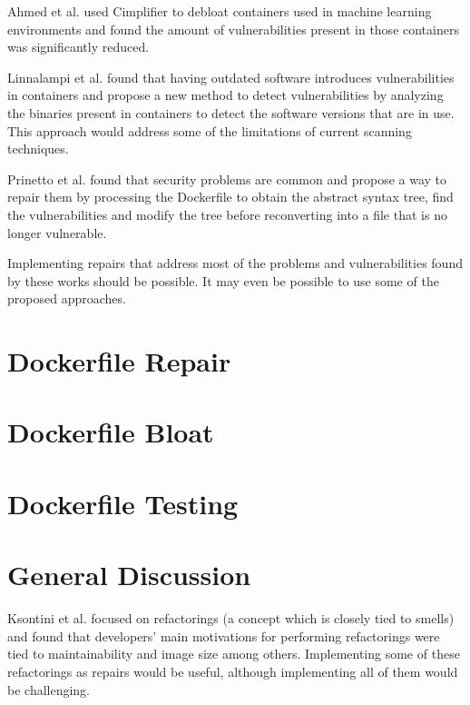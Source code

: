 Ahmed et al. \cite{ahmedSecurityAnalysisCode2022} used Cimplifier \cite{rastogiCimplifierAutomaticallyDebloating2017} to debloat containers used in machine learning environments and found the amount of vulnerabilities present in those containers was significantly reduced.

Linnalampi et al. \cite{linnalampiOutdatedSoftwareContainer2021} found that having outdated software introduces vulnerabilities in containers and propose a new method to detect vulnerabilities by analyzing the binaries present in containers to detect the software versions that are in use. This approach would address some of the limitations of current scanning techniques.

Prinetto et al. \cite{prinettoSecurityMisconfigurationsDetection} found that security problems are common and propose a way to repair them by processing the Dockerfile to obtain the abstract syntax tree, find the vulnerabilities and modify the tree before reconverting into a file that is no longer vulnerable.

Implementing repairs that address most of the problems and vulnerabilities found by these works should be possible. It may even be possible to use some of the proposed approaches.

\section{Dockerfile Repair} \label{sec:dockerfile_repair}
\section{Dockerfile Bloat} \label{sec:dockerfile_bloat}
\section{Dockerfile Testing} \label{sec:dockerfile_testing}
\section{General Discussion} \label{sec:general_discussion}

Ksontini et al. \cite{ksontiniRefactoringsTechnicalDebt} focused on refactorings (a concept which is closely tied to smells) and found that developers' main motivations for performing refactorings were tied to maintainability and image size among others. Implementing some of these refactorings as repairs would be useful, although implementing all of them would be challenging.